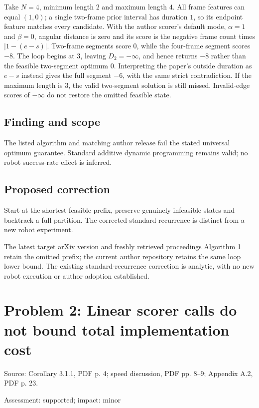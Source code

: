 \documentclass[11pt]{article}
\begin{document}
Take \(N=4\), minimum length \(2\) and maximum length \(4\). All frame features can equal \((1,0)\); a single two-frame prior interval has duration \(1\), so its endpoint feature matches every candidate. With the author scorer’s default mode, \(\alpha=1\) and \(\beta=0\), angular distance is zero and its score is the negative frame count times \(|1-(e-s)|\). Two-frame segments score \(0\), while the four-frame segment scores \(-8\). The loop begins at \(3\), leaving \(D_2=-\infty\), and hence returns \(-8\) rather than the feasible two-segment optimum \(0\). Interpreting the paper’s outside duration as \(e-s\) instead gives the full segment \(-6\), with the same strict contradiction. If the maximum length is \(3\), the valid two-segment solution is still missed. Invalid-edge scores of \(-\infty\) do not restore the omitted feasible state.

\subsection*{Finding and scope}

The listed algorithm and matching author release fail the stated universal optimum guarantee. Standard additive dynamic programming remains valid; no robot success-rate effect is inferred.

\subsection*{Proposed correction}

Start at the shortest feasible prefix, preserve genuinely infeasible states and backtrack a full partition. The corrected standard recurrence is distinct from a new robot experiment.

The latest target arXiv version and freshly retrieved proceedings Algorithm 1 retain the omitted prefix; the current author repository retains the same loop lower bound. The existing standard-recurrence correction is analytic, with no new robot execution or author adoption established.

\section*{Problem 2: Linear scorer calls do not bound total implementation cost}

Source: Corollary 3.1.1, PDF p. 4; speed discussion, PDF pp. 8–9; Appendix A.2, PDF p. 23.

Assessment: supported; impact: minor
\end{document}
